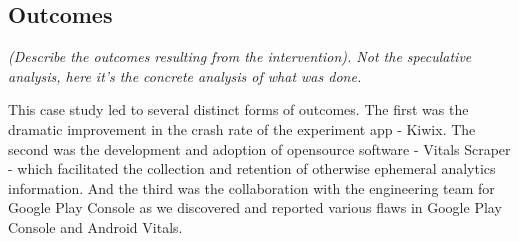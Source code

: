 \subsection{Outcomes}
\textit{(Describe the outcomes resulting from the intervention). Not the speculative analysis, here it’s the concrete analysis of what was done.}

This case study led to several distinct forms of outcomes. The first was the dramatic improvement in the crash rate of the experiment app - Kiwix. The second was the development and adoption of opensource software - Vitals Scraper - which facilitated the collection and retention of otherwise ephemeral analytics information. And the third was the collaboration with the engineering team for Google Play Console as we discovered and reported various flaws in Google Play Console and Android Vitals.

